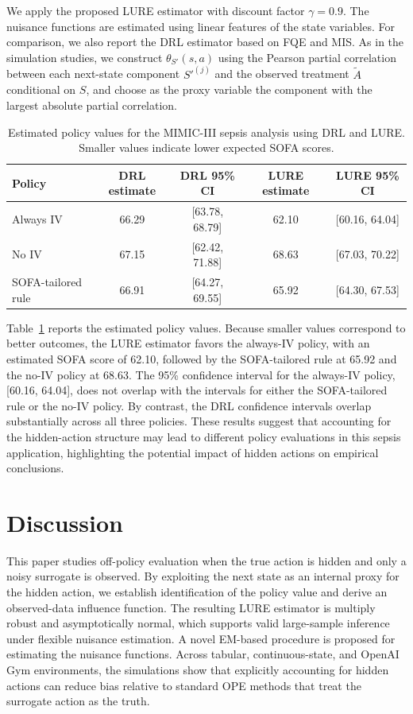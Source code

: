 \documentclass[12pt]{article}
\newcommand{\0}{\boldsymbol{0}}
\begin{document}
We apply the proposed LURE estimator with discount factor $\gamma=0.9$. The nuisance functions are estimated using linear features of the state variables. For comparison, we also report the DRL estimator based on FQE and MIS. As in the simulation studies, we construct $\theta_{S'}(s,a)$ using the Pearson partial correlation between each next-state component $S'^{(j)}$ and the observed treatment $\widetilde A$ conditional on $S$, and choose as the proxy variable the component with the largest absolute partial correlation.


\begin{table}[t]
\centering
\caption{Estimated policy values for the MIMIC-III sepsis analysis using DRL and LURE. Smaller values indicate lower expected SOFA scores.}
\label{tab:mimic}
\begin{tabular}{lcccc}
\toprule
Policy  & DRL estimate & DRL 95\% CI & LURE estimate & LURE 95\% CI \\
\midrule
Always IV  & 66.29 & [63.78, 68.79] & 62.10 & [60.16, 64.04] \\
No IV  & 67.15 & [62.42, 71.88] & 68.63 & [67.03, 70.22]\\
SOFA-tailored rule & 66.91 & [64.27, 69.55] & 65.92 & [64.30, 67.53] \\
\bottomrule
\end{tabular}
\end{table}



Table~\ref{tab:mimic} reports the estimated policy values. Because smaller values correspond to better outcomes, the LURE estimator favors the always-IV policy, with an estimated SOFA score of 62.10, followed by the SOFA-tailored rule at 65.92 and the no-IV policy at 68.63. The 95\% confidence interval for the always-IV policy, [60.16, 64.04], does not overlap with the intervals for either the SOFA-tailored rule or the no-IV policy. By contrast, the DRL confidence intervals overlap substantially across all three policies. These results suggest that accounting for the hidden-action structure may lead to different policy evaluations in this sepsis application, highlighting the potential impact of hidden actions on empirical conclusions.

\section{Discussion} \label{sec: discuss}

This paper studies off-policy evaluation when the true action is hidden and only a noisy surrogate is observed. By exploiting the next state as an internal proxy for the hidden action, we establish identification of the policy value and derive an observed-data influence function. The resulting LURE estimator is multiply robust and asymptotically normal, which supports valid large-sample inference under flexible nuisance estimation. A novel EM-based procedure is proposed for estimating the nuisance functions.
Across tabular, continuous-state, and OpenAI Gym environments, the simulations show that explicitly accounting for hidden actions can reduce bias relative to standard OPE methods that treat the surrogate action as the truth. 
\end{document}
